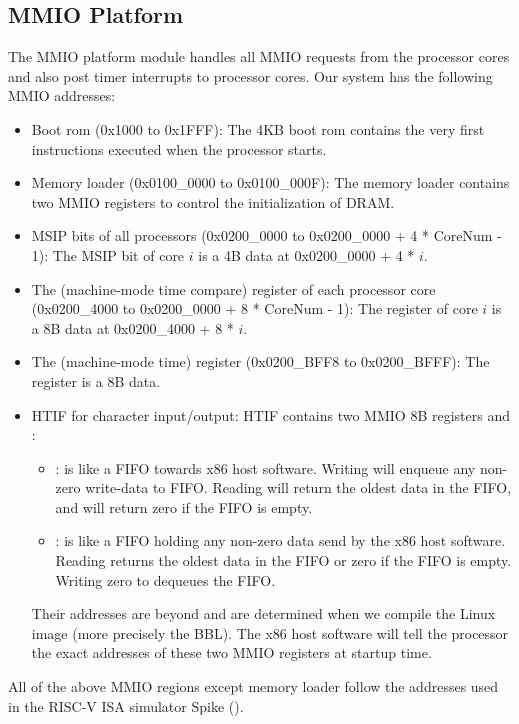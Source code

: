 \subsection{MMIO Platform}
The MMIO platform module handles all MMIO requests from the processor cores and also post timer interrupts to processor cores.
Our system has the following MMIO addresses:
\begin{itemize}
    \item Boot rom (0x1000 to 0x1FFF): The 4KB boot rom contains the very first instructions executed when the processor starts.
    \item Memory loader (0x0100\_0000 to 0x0100\_000F): The memory loader contains two MMIO registers to control the initialization of DRAM.
    \item MSIP bits of all processors (0x0200\_0000 to 0x0200\_0000 + 4 * CoreNum - 1): The MSIP bit of core $i$ is a 4B data at 0x0200\_0000 + 4 * $i$.
    \item The  (machine-mode time compare) register of each processor core (0x0200\_4000 to 0x0200\_0000 + 8 * CoreNum - 1): The  register of core $i$ is a 8B data at 0x0200\_4000 + 8 * $i$.
    \item The  (machine-mode time) register (0x0200\_BFF8 to 0x0200\_BFFF): The  register is a 8B data.
    \item HTIF for character input/output: HTIF contains two MMIO 8B registers  and :
    \begin{itemize}
        \item {}: is like a FIFO towards x86 host software.
        Writing  will enqueue any non-zero write-data to FIFO.
        Reading  will return the oldest data in the FIFO, and will return zero if the FIFO is empty.
        \item {}: is like a FIFO holding any non-zero data send by the x86 host software.
        Reading  returns the oldest data in the FIFO or zero if the FIFO is empty.
        Writing zero to  dequeues the FIFO.
    \end{itemize}
    Their addresses are beyond  and are determined when we compile the Linux image (more precisely the BBL).
    The x86 host software will tell the processor the exact addresses of these two MMIO registers at startup time.
\end{itemize}
All of the above MMIO regions except memory loader follow the addresses used in the RISC-V ISA simulator Spike ().

